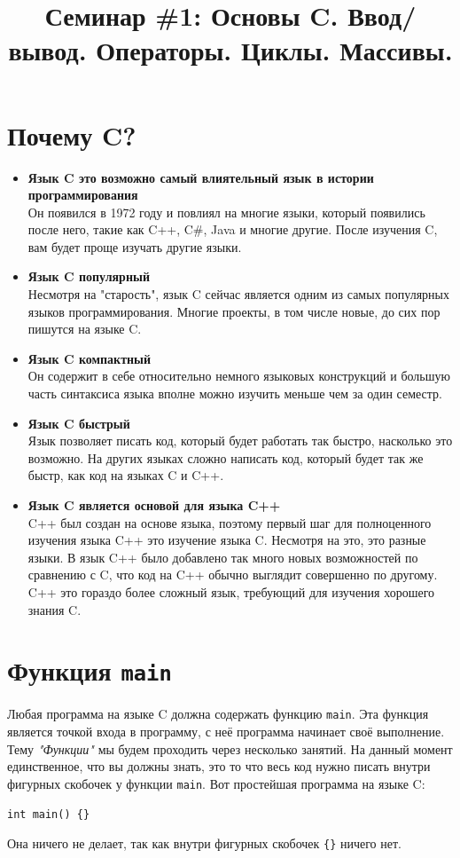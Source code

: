 \documentclass[10pt]{article}
\begin{document}
\title{Семинар \#1: Основы C. Ввод/вывод. Операторы. Циклы. Массивы. \vspace{-5ex}}\date{}\maketitle
\section*{Почему C?}
\begin{itemize}
\item \textbf{Язык C это возможно самый влиятельный язык в истории программирования}\\
Он появился в 1972 году и повлиял на многие языки, который появились после него, такие как C++, C\#, Java и многие другие. После изучения C, вам будет проще изучать другие языки.

\item \textbf{Язык C популярный}\\
Несмотря на "старость", язык C сейчас является одним из самых популярных языков программирования.
Многие проекты, в том числе новые, до сих пор пишутся на языке C.

\item \textbf{Язык C компактный}\\
Он содержит в себе относительно немного языковых конструкций и большую часть синтаксиса языка вполне можно 
изучить меньше чем за один семестр.

\item \textbf{Язык C быстрый}\\
Язык позволяет писать код, который будет работать так быстро, насколько это возможно.
На других языках сложно написать код, который будет так же быстр, как код на языках C и C++.


\item \textbf{Язык C является основой для языка C++}\\
C++ был создан на основе языка, поэтому первый шаг для полноценного изучения языка C++ это изучение языка C.
Несмотря на это, это разные языки. В язык C++ было добавлено так много новых возможностей по сравнению с C,
что код на C++ обычно выглядит совершенно по другому.
C++ это гораздо более сложный язык, требующий для изучения хорошего знания C.
\end{itemize}


\section*{Функция \texttt{main}}
\indent Любая программа на языке C должна содержать функцию \texttt{main}.
Эта функция является точкой входа в программу, с неё программа начинает своё выполнение.
Тему \textit{"Функции"} мы будем проходить через несколько занятий.
На данный момент единственное, что вы должны знать, это то что весь код нужно писать внутри фигурных скобочек \texttt{{}} у функции \texttt{main}.
Вот простейшая программа на языке C: 
\begin{lstlisting}
int main() {}
\end{lstlisting}
Она ничего не делает, так как внутри фигурных скобочек \texttt{\{\}} ничего нет.
\end{document}
